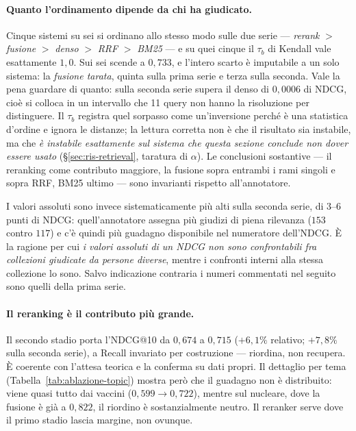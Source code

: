 \documentclass[11pt,a4paper]{report}
\begin{document}
\paragraph{Quanto l'ordinamento dipende da chi ha giudicato.} Cinque sistemi su sei si ordinano allo
stesso modo sulle due serie --- \emph{rerank} $>$ \emph{fusione} $>$ \emph{denso} $>$ \emph{RRF} $>$
\emph{BM25} --- e su quei cinque il $\tau_b$ di Kendall vale esattamente $1{,}0$. Sui sei scende a
$0{,}733$, e l'intero scarto è imputabile a un solo sistema: la \emph{fusione tarata}, quinta sulla
prima serie e terza sulla seconda. Vale la pena guardare di quanto: sulla seconda serie supera il
denso di $0{,}0006$ di NDCG, cioè si colloca in un intervallo che 11 query non hanno la risoluzione
per distinguere. Il $\tau_b$ registra quel sorpasso come un'inversione perché è una statistica
d'ordine e ignora le distanze; la lettura corretta non è che il risultato sia instabile, ma che
\emph{è instabile esattamente sul sistema che questa sezione conclude non dover essere usato}
(\S\ref{sec:ris-retrieval}, taratura di $\alpha$). Le conclusioni sostantive --- il reranking come
contributo maggiore, la fusione sopra entrambi i rami singoli e sopra RRF, BM25 ultimo --- sono
invarianti rispetto all'annotatore.

I valori assoluti sono invece sistematicamente più alti sulla seconda serie, di $3$--$6$ punti di
NDCG: quell'annotatore assegna più giudizi di piena rilevanza ($153$ contro $117$) e c'è quindi più
guadagno disponibile nel numeratore dell'NDCG. È la ragione per cui \emph{i valori assoluti di un
NDCG non sono confrontabili fra collezioni giudicate da persone diverse}, mentre i confronti interni
alla stessa collezione lo sono. Salvo indicazione contraria i numeri commentati nel seguito sono
quelli della prima serie.

\paragraph{Il reranking è il contributo più grande.} Il secondo stadio porta l'NDCG@10 da $0{,}674$
a $0{,}715$ ($+6{,}1\%$ relativo; $+7{,}8\%$ sulla seconda serie), a Recall invariato per costruzione
--- riordina, non recupera. È coerente con l'attesa teorica e la conferma su dati propri. Il
dettaglio per tema (Tabella~\ref{tab:ablazione-topic}) mostra però che il guadagno non è distribuito:
viene quasi tutto dai vaccini ($0{,}599 \to 0{,}722$), mentre sul nucleare, dove la fusione è già a
$0{,}822$, il riordino è sostanzialmente neutro. Il reranker serve dove il primo stadio lascia
margine, non ovunque.
\end{document}

